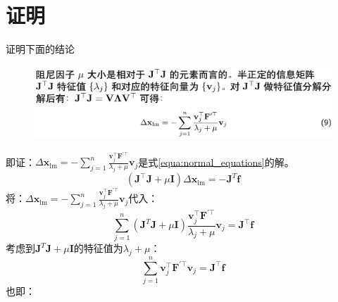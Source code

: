 \documentclass[oneside]{article}
\begin{document}
\section{证明}
证明下面的结论
\begin{figure}[h]
    \centering
    \includegraphics[width=.8\linewidth]{figures/fig4.png}    
\end{figure}

即证：$\Delta \mathbf{x}_{\operatorname{lm}}=-\sum_{j=1}^{n} \frac{\mathbf{v}_{j}^{\top} \mathbf{F}^{\prime \top}}{\lambda_{j}+\mu} \mathbf{v}_{j}$是式\ref{equa:normal_equations}的解。
\begin{equation}
    (\mathbf{J}^\top\mathbf{J} + \mu \mathbf{I}) \Delta \mathbf{x}_{\operatorname{lm}} = - \mathbf{J} ^T  \mathbf{f}
    \label{equa:normal_equations}
\end{equation}
将：$\Delta \mathbf{x}_{\operatorname{lm}}=-\sum_{j=1}^{n} \frac{\mathbf{v}_{j}^{\top} \mathbf{F}^{\prime \top}}{\lambda_{j}+\mu} \mathbf{v}_{j}$代入：
\begin{equation}
    \sum_{j=1}^{n}(\mathbf{J}^T\mathbf{J} + \mu \mathbf{I})  \frac{\mathbf{v}_{j}^{\top} \mathbf{F}^{\prime \top}}{\lambda_{j}+\mu} \mathbf{v}_{j} = \mathbf{J} ^\top  \mathbf{f}
\end{equation}
考虑到$\mathbf{J}^T\mathbf{J} + \mu \mathbf{I}$的特征值为$\lambda_{j}+\mu$：
\begin{equation}
    \sum_{j=1}^{n} \mathbf{v}_{j}^{\top} \mathbf{F}^{\prime \top} \mathbf{v}_{j} = \mathbf{J} ^\top  \mathbf{f} 
\end{equation}
也即：
\end{document}
